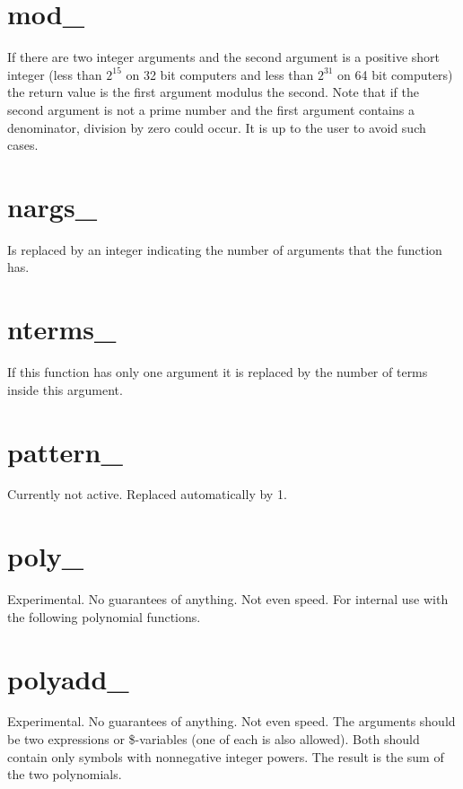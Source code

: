 \section{mod\_}
\label{funmod}
\noindent If there are two integer arguments and the second 
argument is a positive short integer (less than $2^{15}$ on 32 bit 
computers and less than $2^{31}$ on 64 bit computers) the return value is 
the first argument modulus the second. Note that if the second argument is 
not a prime number and the first argument contains a denominator, division 
by zero could occur. It is up to the user to avoid such cases.

\section{nargs\_}
\label{funnargs}
\noindent Is replaced by an integer indicating the number of 
arguments that the function has.

\section{nterms\_}
\label{funnterms}
\noindent If this function has only one argument it is replaced by 
the number of terms inside this argument.

\section{pattern\_}
\label{funpattern}
\noindent Currently not active. Replaced automatically by 1.

\section{poly\_}
\label{funpoly}
\noindent Experimental. No guarantees of anything. Not even speed. 
For internal use with the following polynomial functions.

\section{polyadd\_}
\label{funpolyadd}
\noindent Experimental. No guarantees of anything. Not even speed. The 
arguments should be two expressions or 
\$-variables (one of each is also allowed). Both should 
contain only symbols with nonnegative integer powers. The result is the sum 
of the two polynomials.

